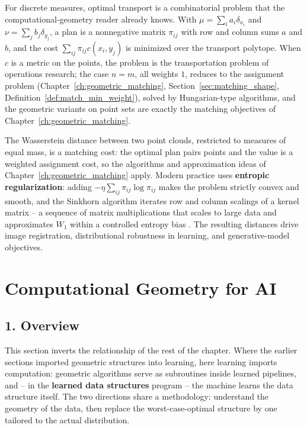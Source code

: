 For discrete measures, optimal transport is a combinatorial problem that
the computational-geometry reader already knows. With
$\mu = \sum_i a_i \delta_{x_i}$ and $\nu = \sum_j b_j \delta_{y_j}$, a plan
is a nonnegative matrix $\pi_{ij}$ with row and column sums $a$ and $b$,
and the cost $\sum_{ij} \pi_{ij} c(x_i, y_j)$ is minimized over the
transport polytope. When $c$ is a metric on the points, the problem is the
transportation problem of operations research; the case $n = m$, all
weights $1$, reduces to the assignment problem (Chapter~\ref{ch:geometric_matching},
Section~\ref{sec:matching_shape}, Definition~\ref{def:match_min_weight}),
solved by Hungarian-type algorithms, and the geometric variants on point
sets are exactly the matching objectives of Chapter~\ref{ch:geometric_matching}.

\begin{remark}
  The Wasserstein distance between two point clouds, restricted to measures
  of equal mass, is a matching cost: the optimal plan pairs points and the
  value is a weighted assignment cost, so the algorithms and approximation
  ideas of Chapter~\ref{ch:geometric_matching} apply. Modern practice uses
  \textbf{entropic regularization}: adding
  $-\eta \sum_{ij} \pi_{ij} \log \pi_{ij}$ makes the problem strictly convex
  and smooth, and the Sinkhorn algorithm iterates row and column
  scalings of a kernel matrix -- a sequence of matrix multiplications that
  scales to large data and approximates $W_1$ within a controlled entropy
  bias \cite{peyre2019}. The resulting distances drive image registration,
  distributional robustness in learning, and generative-model objectives.
\end{remark}


\section{Computational Geometry for AI}
\label{sec:data_ml_ai}

\subsection{1. Overview}

This section inverts the relationship of the rest of the chapter. Where the
earlier sections imported geometric structures into learning, here learning
imports computation: geometric algorithms serve as subroutines inside
learned pipelines, and -- in the \textbf{learned data structures} program --
the machine learns the data structure itself. The two directions share a
methodology: understand the geometry of the data, then replace the
worst-case-optimal structure by one tailored to the actual distribution.

